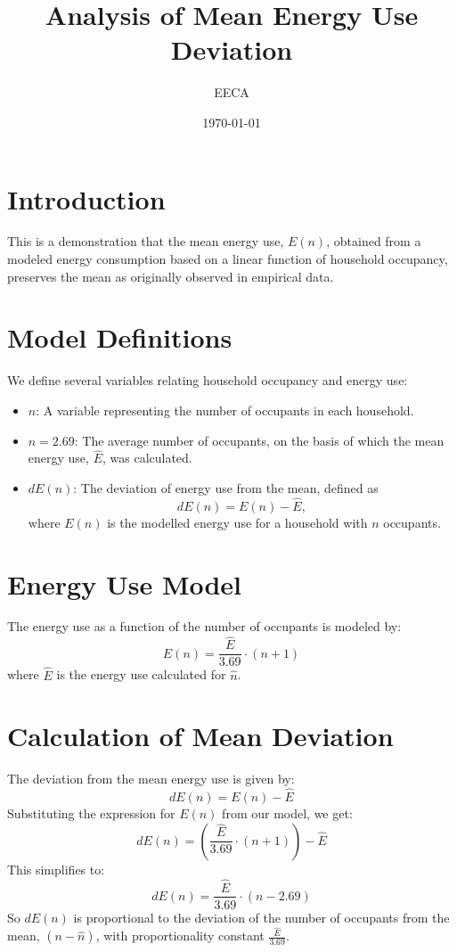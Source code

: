 \documentclass{article}
\begin{document}
\title{Analysis of Mean Energy Use Deviation}
\author{EECA}
\date{\today}

\maketitle 

\section{Introduction}
This is a demonstration that the mean energy use, \(E(n)\), obtained from a modeled energy consumption based on a linear function of household occupancy, preserves the mean as originally observed in empirical data.

\section{Model Definitions}
We define several variables relating household occupancy and energy use:
\begin{itemize}
    \item \(n\): A variable representing the number of occupants in each household.
    \item \(\hat{n} = 2.69\): The average number of occupants, on the basis of which the mean energy use, \(\hat{E}\), was calculated.
    \item \(dE(n)\): The deviation of energy use from the mean, defined as \[dE(n) = E(n) - \hat{E},\] where \(E(n)\) is the modelled energy use for a household with \(n\) occupants.
\end{itemize}

\section{Energy Use Model}
The energy use as a function of the number of occupants is modeled by:
\[
E(n) = \frac{\hat{E}}{3.69} \cdot (n + 1)
\]
where \(\hat{E}\) is the energy use calculated for \(\hat{n}\).

\section{Calculation of Mean Deviation}
The deviation from the mean energy use is given by:
\[
dE(n) = E(n) - \hat{E}
\]
Substituting the expression for \(E(n)\) from our model, we get:
\[
dE(n) = \left(\frac{\hat{E}}{3.69} \cdot (n + 1)\right) - \hat{E}
\]
This simplifies to:
\[
dE(n) = \frac{\hat{E}}{3.69} \cdot (n - 2.69)
\]
So \(dE(n)\) is proportional to the deviation of the number of occupants from the mean, \((n - \hat{n})\), with proportionality constant \(\frac{\hat{E}}{3.69}\).
\end{document}
